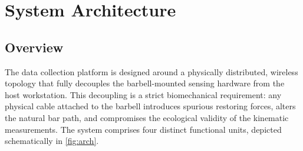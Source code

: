 \section{System Architecture}\label{sec:arch}

\subsection{Overview}

The data collection platform is designed around a physically distributed, wireless topology that fully decouples the barbell-mounted sensing hardware from the host workstation.
This decoupling is a strict biomechanical requirement: any physical cable attached to the barbell introduces spurious restoring forces, alters the natural bar path, and compromises the ecological validity of the kinematic measurements.
The system comprises four distinct functional units, depicted schematically in \cref{fig:arch}.

